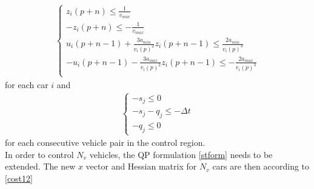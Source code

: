 \documentclass[letterpaper,10pt,conference]{ieeeconf}
\begin{document}
\begin{align}\label{ineq}
        \begin{cases}
            z_i(p+n) \leq \frac{1}{v_{min}} \\
            -z_i(p+n) \leq -\frac{1}{v_{max}}  \\
            u_i(p+n-1) + \frac{3a_{min}}{v_{i}(p)^2}z_i(p+n-1) \leq \frac{2a_{min}}{v_{i}(p)^3} \\
            -u_i(p+n-1) - \frac{3a_{max}}{v_{i}(p)^2}z_i(p+n-1) \leq -\frac{2a_{max}}{v_{i}(p)^3} \\
        \end{cases}
\end{align}
for each car $i$ and
\begin{align}\label{ineq2}
        \begin{cases}
            - s_j \leq 0\\
            - s_j - q_j \leq - \Delta t\\
            -q_j \leq 0
        \end{cases}
\end{align}
for each consecutive vehicle pair in the control region.\\ \indent
In order to control $N_v$ vehicles, the QP formulation \eqref{stform} needs to be extended. The new $x$ vector and Hessian matrix for $N_v$ cars are then according to \eqref{cost12}

\end{document}
